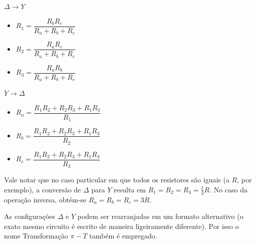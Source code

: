 \documentclass{article}
\numberwithin{equation}{section}
\newlength\Colsep
\let\dfr\dfrac
\begin{document}
\vspace{1.2cm}

\noindent\begin{minipage}{\textwidth}
\begin{minipage}[c][2cm][c]{\dimexpr0.45\textwidth-0.5\Colsep\relax}
    \begin{center}
    $\Delta \longrightarrow Y$
      \vspace{0.2cm}
     \begin{itemize}
        \item $R_1=\dfr{R_bR_c}{R_a+R_b+R_c}$
        \item $R_2=\dfr{R_aR_c}{R_a+R_b+R_c}$
        \item $R_3=\dfr{R_aR_b}{R_a+R_b+R_c}$
    \end{itemize}

    \end{center}
\end{minipage} \hfill
\begin{minipage}[c][2cm][c]{\dimexpr0.1\textwidth-0.5\Colsep\relax}

\end{minipage} \hfill
\begin{minipage}[c][2cm][c]{\dimexpr0.45\textwidth-0.5\Colsep\relax}
    \begin{center}
    $Y \longrightarrow \Delta$
    \vspace{0.2cm}

    \begin{itemize}
    \item $R_a=\dfr{R_1R_2+R_2R_3+R_1R_3}{R_1}$
    \item $R_b=\dfr{R_1R_2+R_2R_3+R_1R_3}{R_2}$
    \item $R_c=\dfr{R_1R_2+R_2R_3+R_1R_3}{R_3}$
\end{itemize}

    \end{center}
\end{minipage}
\end{minipage}

\vspace{1.5cm}


Vale notar que no caso particular em que todos os resistores são iguais (a $R$, por exemplo), a conversão de $\Delta$ para $Y$ resulta em $R_1=R_2=R_3=\frac{1}{3}R$. No caso da operação inversa, obtém-se $R_a=R_b=R_c=3R$.

As configurações $\Delta$ e $Y$ podem ser rearranjadas em um formato alternativo (o exato mesmo circuito é escrito de maneira ligeiramente diferente). Por isso o nome Transformação $\pi-T$ também é empregado.
\end{document}
